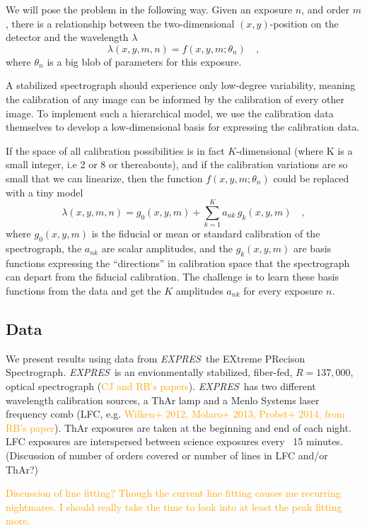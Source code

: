 \documentclass[12pt, letterpaper]{article}
\newcommand{\lz}[1]{\textcolor{orange}{#1}}
\newcommand{\project}[1]{\textsl{#1}}
\newcommand{\acronym}[1]{{\small{#1}}}
\newcommand{\expres}{\project{\acronym{EXPRES}}}
\begin{document}
We will pose the problem in the following way.  Given an exposure $n$, and order $m$, there is a relationship between
the two-dimensional $(x,y)$-position on the detector and the
wavelength $\lambda$
\begin{equation}
\lambda(x,y,m,n) = f(x,y,m;\theta_{n})
\quad ,
\end{equation}
where $\theta_{n}$ is a big blob of parameters for this exposure.

A stabilized spectrograph should experience only low-degree variability, meaning the calibration of any image can be informed by the calibration of every other image.  To implement such a hierarchical model, we use the calibration data themselves to develop a low-dimensional basis for expressing the calibration data.

If the space of all calibration possibilities is in fact $K$-dimensional (where K is a small integer, i.e 2 or 8 or thereabouts), and if the calibration variations are so
small that we can linearize, then the function $f(x,y,m;\theta_{n})$ could
be replaced with a tiny model
\begin{equation}
\lambda(x,y,m,n) = g_0(x,y,m) + \sum_{k=1}^K a_{nk}\,g_k(x,y,m)
\quad ,
\end{equation}
where
$g_0(x,y,m)$ is the fiducial or mean or standard calibration of the
spectrograph,
the $a_{nk}$ are scalar amplitudes,
and the $g_k(x,y,m)$ are basis functions expressing the ``directions'' in calibration space that the spectrograph can depart from the
fiducial calibration.
The challenge is to learn these basis functions from the data and get
the $K$ amplitudes $a_{nk}$ for every exposure $n$.

\subsection{Data} \label{sec:data}
We present results using data from \expres\, the EXtreme PRecison Spectrograph.  \expres\ is an envionmentally stabilized, fiber-fed, $R=137,000$, optical spectrograph (\lz{CJ and RB's papers}).  \expres\ has two different wavelength calibration sources, a ThAr lamp and a Menlo Systems laser frequency comb (LFC, e.g. \lz{Wilken+ 2012, Molaro+ 2013, Probst+ 2014, from RB's paper}).  ThAr exposures are taken at the beginning and end of each night.  LFC exposures are interspersed between science exposures every ~15 minutes.  
(Discussion of number of orders covered or number of lines in LFC and/or ThAr?)

\lz{Discussion of line fitting?  Though the current line fitting causes me recurring nightmares.  I should really take the time to look into at least the peak fitting more.}
\end{document}
